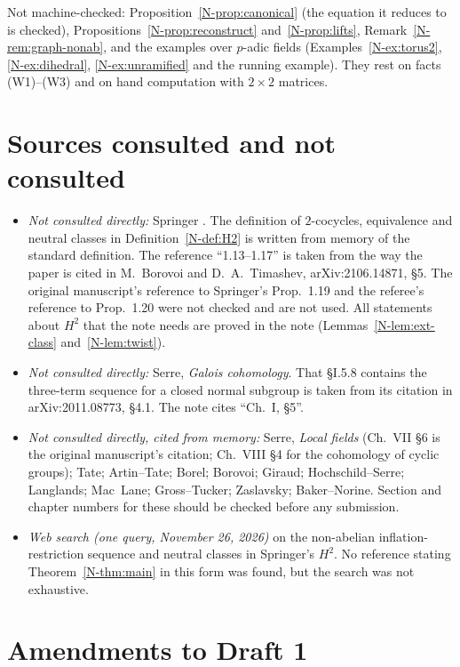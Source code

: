 \documentclass[12pt,letterpaper]{article}
\begin{document}
Not machine-checked: Proposition~\ref{N-prop:canonical} (the equation it
reduces to is checked), Propositions~\ref{N-prop:reconstruct}
and~\ref{N-prop:lifts}, Remark~\ref{N-rem:graph-nonab}, and the examples
over $p$-adic fields (Examples~\ref{N-ex:torus2},
\ref{N-ex:dihedral}, \ref{N-ex:unramified} and the running example). They
rest on facts (W1)--(W3) and on hand computation with $2\times2$ matrices.

\section{Sources consulted and not consulted}\label{sec:sources}

\begin{itemize}[itemsep=2pt]
\item \emph{Not consulted directly:} Springer \cite{Sp66}. The definition
  of $2$-cocycles, equivalence and neutral classes in
  Definition~\ref{N-def:H2} is written from memory of the standard
  definition. The reference ``1.13--1.17'' is taken from the way the paper
  is cited in M.~Borovoi and D.~A.~Timashev, arXiv:2106.14871, \S5. The
  original manuscript's reference to Springer's Prop.~1.19 and the
  referee's reference to Prop.~1.20 were not checked and are not used. All
  statements about $H^2$ that the note needs are proved in the note
  (Lemmas~\ref{N-lem:ext-class} and~\ref{N-lem:twist}).
\item \emph{Not consulted directly:} Serre, \emph{Galois cohomology}. That
  \S I.5.8 contains the three-term sequence for a closed normal subgroup
  is taken from its citation in arXiv:2011.08773, \S4.1. The note cites
  ``Ch.~I, \S5''.
\item \emph{Not consulted directly, cited from memory:} Serre,
  \emph{Local fields} (Ch.~VII \S6 is the original manuscript's citation;
  Ch.~VIII \S4 for the cohomology of cyclic groups); Tate; Artin--Tate;
  Borel; Borovoi; Giraud; Hochschild--Serre; Langlands; Mac~Lane;
  Gross--Tucker; Zaslavsky; Baker--Norine. Section and chapter numbers for
  these should be checked before any submission.
\item \emph{Web search (one query, November 26, 2026)} on the non-abelian
  inflation-restriction sequence and neutral classes in Springer's $H^2$.
  No reference stating Theorem~\ref{N-thm:main} in this form was found,
  but the search was not exhaustive.
\end{itemize}



\section{Amendments to Draft 1}\label{sec:amend}
\end{document}
